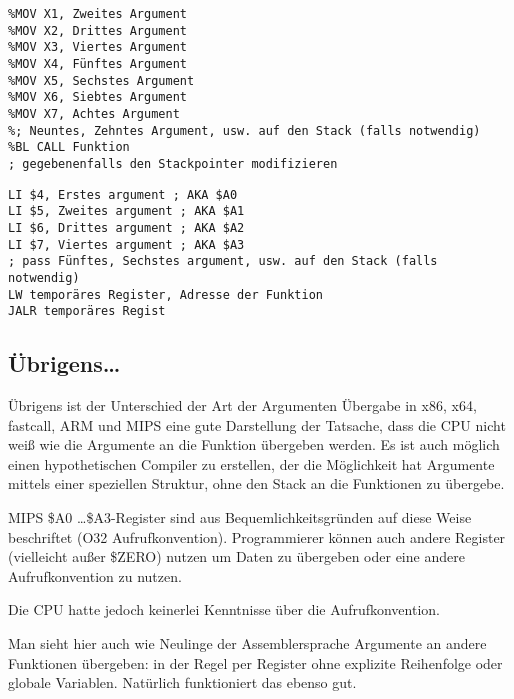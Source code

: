 \begin{lstlisting}[caption=ARM64,style=customasmARM]
%MOV X0, Erstes Argument
%MOV X1, Zweites Argument
%MOV X2, Drittes Argument
%MOV X3, Viertes Argument
%MOV X4, Fünftes Argument
%MOV X5, Sechstes Argument
%MOV X6, Siebtes Argument
%MOV X7, Achtes Argument
%; Neuntes, Zehntes Argument, usw. auf den Stack (falls notwendig)
%BL CALL Funktion
; gegebenenfalls den Stackpointer modifizieren
\end{lstlisting}

\begin{lstlisting}[caption=MIPS (O32 calling convention),style=customasmMIPS]
LI $4, Erstes argument ; AKA $A0
LI $5, Zweites argument ; AKA $A1
LI $6, Drittes argument ; AKA $A2
LI $7, Viertes argument ; AKA $A3
; pass Fünftes, Sechstes argument, usw. auf den Stack (falls notwendig)
LW temporäres Register, Adresse der Funktion
JALR temporäres Regist
\end{lstlisting}

\subsection{Übrigens\dots{}}

Übrigens ist der Unterschied der Art der Argumenten Übergabe in x86, x64, fastcall, ARM und MIPS eine gute
Darstellung der Tatsache, dass die CPU nicht weiß wie die Argumente an die Funktion übergeben werden.
Es ist auch möglich einen hypothetischen Compiler zu erstellen, der die Möglichkeit hat Argumente mittels
einer speziellen Struktur, ohne den Stack an die Funktionen zu übergebe.

MIPS \$A0 \dots \$A3-Register sind aus Bequemlichkeitsgründen auf diese Weise beschriftet (O32 Aufrufkonvention).
Programmierer können auch andere Register (vielleicht außer \$ZERO) nutzen um Daten zu übergeben
oder eine andere Aufrufkonvention zu nutzen.

Die \ac{CPU} hatte jedoch keinerlei Kenntnisse über die Aufrufkonvention.

Man sieht hier auch wie Neulinge der Assemblersprache Argumente an andere Funktionen übergeben:
in der Regel per Register ohne explizite Reihenfolge oder globale Variablen.
Natürlich funktioniert das ebenso gut.
